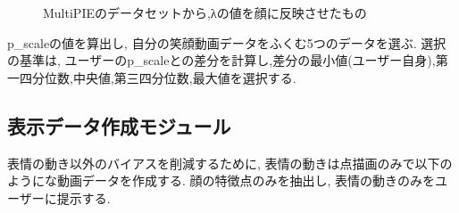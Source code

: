 \begin{figure}[htbp]
    \begin{center}
    \end{center}
    \caption{Multi\-PIEのデータセットから,λの値を顔に反映させたもの}
    \label{fig:face_balance}
\end{figure}

p\_scaleの値を算出し, 自分の笑顔動画データをふくむ5つのデータを選ぶ.
選択の基準は, ユーザーのp\_scaleとの差分を計算し,差分の最小値(ユーザー自身),第一四分位数,中央値,第三四分位数,最大値を選択する.

\subsection{表示データ作成モジュール}
表情の動き以外のバイアスを削減するために, 表情の動きは点描画のみで以下のようにな動画データを作成する.
顔の特徴点のみを抽出し, 表情の動きのみをユーザーに提示する.

